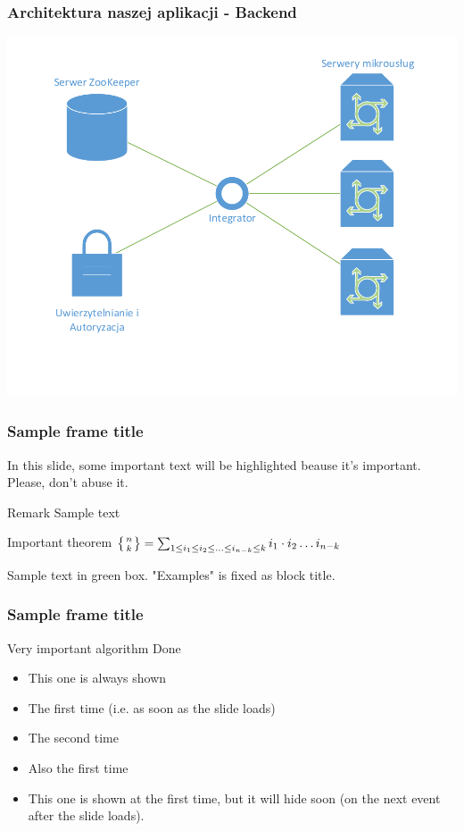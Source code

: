 \documentclass{beamer}
\begin{document}
\begin{frame}
\frametitle{Architektura naszej aplikacji - Backend}
\includegraphics[width=\textwidth]{backend.pdf}
\end{frame}

\begin{frame}
\frametitle{Sample frame title}
 
In this slide, some important text will be
\alert{highlighted} beause it's important.
Please, don't abuse it.
 
\begin{block}{Remark}
Sample text
\end{block}
 
\begin{alertblock}{Important theorem}
$\left\{{n}\atop{k}\right\} = %
\sum_{1\le i_1\le i_2 \le \ldots \le i_{n-k}\le k} %
i_1\cdot i_2\dots i_{n-k}$ %
\end{alertblock}
 
\begin{examples}
Sample text in green box. "Examples" is fixed as block title.
\end{examples}
\end{frame}

\begin{frame}[fragile]
\frametitle{Sample frame title}
 
Very important algorithm
Done

\end{frame}

\begin{frame}
\begin{itemize}
	\item This one is always shown
	\item<1-> The first time (i.e. as soon as the slide loads)
	\item<2-> The second time
	\item<1-> Also the first time
	\item<1-1> {This one is shown at the first time, but it will hide soon (on the next event after the slide loads).}
\end{itemize}
\end{frame}
\end{document}
